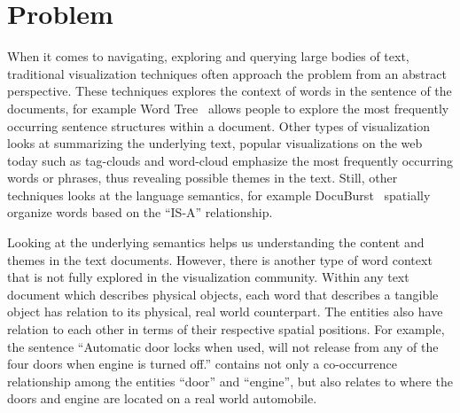 

\section{Problem}
When it comes to navigating, exploring and querying large bodies of text,
traditional visualization techniques often approach the problem from an abstract
perspective. These techniques explores the context of words in the sentence of
the documents, for example Word Tree~\cite{Wattenberg2008} allows people to
explore the most frequently occurring sentence structures within a document.
Other types of visualization looks at summarizing the underlying text, popular 
visualizations on the web today such as tag-clouds and word-cloud emphasize
the most frequently occurring words or phrases, thus revealing possible themes in
the text. Still, other techniques looks at the language semantics, for example 
DocuBurst~\cite{COL2009a} spatially organize words based on the ``IS-A''
relationship.

Looking at the underlying semantics helps us understanding the content and 
themes in the text documents. However, there is another type of word context 
that is not fully explored in the visualization community. Within any text 
document which describes physical objects, each word that describes a 
tangible object has relation to its physical, real world counterpart. The 
entities also have relation to each other in terms of their respective 
spatial positions. For example, the sentence ``Automatic door locks when 
used, will not release from any of the four doors when engine is turned off.'' 
contains not only a co-occurrence relationship among the entities ``door'' and 
``engine'', but also relates to where the doors and engine are located on a 
real world automobile.


